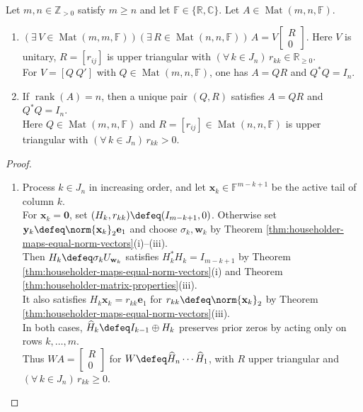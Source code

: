 \begin{theorem} \label{thm:qr-factorization} \\
Let $m,n\in\mathbb{Z}_{>0}$ satisfy $m\geq n$ and let $\mathbb{F}\in\{\mathbb{R},\mathbb{C}\}$. Let $A\in\operatorname{Mat}(m,n,\mathbb{F})$.
\begin{enumerate}[label=(\roman*)]
\setlength{\itemsep}{0pt}
\item $(\exists\,V\in\operatorname{Mat}(m,m,\mathbb{F}))(\exists\,R\in\operatorname{Mat}(n,n,\mathbb{F}))\,A=V\left[\begin{smallmatrix}R\\0\end{smallmatrix}\right]$. Here $V$ is unitary, $R=[r_{ij}]$ is upper triangular with $(\forall\,k\in J_n)\,r_{kk}\in\mathbb{R}_{\geq0}$.\\
For $V=[Q\ Q']$ with $Q\in\operatorname{Mat}(m,n,\mathbb{F})$, one has $A=QR$ and $Q^*Q=I_n$.
\item If $\operatorname{rank}(A)=n$, then a unique pair $(Q,R)$ satisfies $A=QR$ and $Q^*Q=I_n$.\\
Here $Q\in\operatorname{Mat}(m,n,\mathbb{F})$ and $R=[r_{ij}]\in\operatorname{Mat}(n,n,\mathbb{F})$ is upper triangular with $(\forall\,k\in J_n)\,r_{kk}>0$.
\end{enumerate}
\begin{proof}
\begin{enumerate}[label=(\roman*)]
\setlength{\itemsep}{0pt}
\item Process $k\in J_n$ in increasing order, and let $\mathbf{x}_k\in\mathbb{F}^{m-k+1}$ be the active tail of column $k$.\\
For $\mathbf{x}_k=\mathbf{0}$, set $(H_k,r_{kk})\defeq(I_{m-k+1},0)$. Otherwise set $\mathbf{y}_k\defeq\norm{\mathbf{x}_k}_2\mathbf{e}_1$ and choose $\sigma_k,\mathbf{w}_k$ by Theorem \ref{thm:householder-maps-equal-norm-vectors}(i)--(iii).\\
Then $H_k\defeq\sigma_kU_{\mathbf{w}_k}$ satisfies $H_k^*H_k=I_{m-k+1}$ by Theorem \ref{thm:householder-maps-equal-norm-vectors}(i) and Theorem \ref{thm:householder-matrix-properties}(iii).\\
It also satisfies $H_k\mathbf{x}_k=r_{kk}\mathbf{e}_1$ for $r_{kk}\defeq\norm{\mathbf{x}_k}_2$ by Theorem \ref{thm:householder-maps-equal-norm-vectors}(iii).\\
In both cases, $\widehat H_k\defeq I_{k-1}\oplus H_k$ preserves prior zeros by acting only on rows $k,\ldots,m$.\\
Thus $WA=\left[\begin{smallmatrix}R\\0\end{smallmatrix}\right]$ for $W\defeq\widehat H_n\cdots\widehat H_1$, with $R$ upper triangular and $(\forall\,k\in J_n)\,r_{kk}\geq0$.\\

\end{enumerate}
\end{proof}
\end{theorem}
